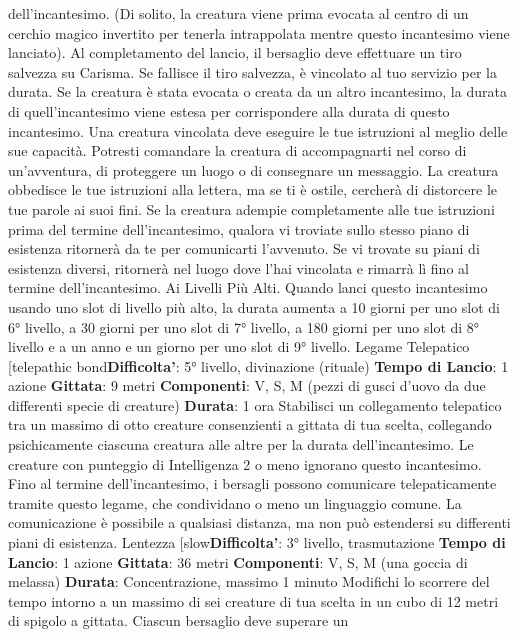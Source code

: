 \begin{multicols}{2}
dell’incantesimo. (Di solito, la creatura viene prima
evocata al centro di un cerchio magico invertito per
tenerla intrappolata mentre questo incantesimo viene
lanciato). Al completamento del lancio, il bersaglio deve
effettuare un tiro salvezza su Carisma. Se fallisce il tiro
salvezza, è vincolato al tuo servizio per la durata. Se la
creatura è stata evocata o creata da un altro
incantesimo, la durata di quell’incantesimo viene estesa
per corrispondere alla durata di questo incantesimo.
Una creatura vincolata deve eseguire le tue istruzioni al
meglio delle sue capacità. Potresti comandare la
creatura di accompagnarti nel corso di un’avventura, di
proteggere un luogo o di consegnare un messaggio. La
creatura obbedisce le tue istruzioni alla lettera, ma se ti
è ostile, cercherà di distorcere le tue parole ai suoi fini.
Se la creatura adempie completamente alle tue
istruzioni prima del termine dell’incantesimo, qualora vi
troviate sullo stesso piano di esistenza ritornerà da te
per comunicarti l’avvenuto. Se vi trovate su piani di
esistenza diversi, ritornerà nel luogo dove l’hai vincolata
e rimarrà lì fino al termine dell’incantesimo.
Ai Livelli Più Alti. Quando lanci questo incantesimo
usando uno slot di livello più alto, la durata aumenta a
10 giorni per uno slot di 6° livello, a 30 giorni per uno
slot di 7° livello, a 180 giorni per uno slot di 8° livello e a
un anno e un giorno per uno slot di 9° livello.
Legame Telepatico
[telepathic bond\textbf{Difficolta'}:
5° livello, divinazione (rituale)
\textbf{Tempo di Lancio}: 1 azione
\textbf{Gittata}: 9 metri
\textbf{Componenti}: V, S, M (pezzi di gusci d’uovo da due
differenti specie di creature)
\textbf{Durata}: 1 ora
Stabilisci un collegamento telepatico tra un massimo di
otto creature consenzienti a gittata di tua scelta,
collegando psichicamente ciascuna creatura alle altre
per la durata dell’incantesimo. Le creature con
punteggio di Intelligenza 2 o meno ignorano questo
incantesimo.
Fino al termine dell’incantesimo, i bersagli possono
comunicare telepaticamente tramite questo legame,
che condividano o meno un linguaggio comune. La
comunicazione è possibile a qualsiasi distanza, ma non
può estendersi su differenti piani di esistenza.
Lentezza
[slow\textbf{Difficolta'}:
3° livello, trasmutazione
\textbf{Tempo di Lancio}: 1 azione
\textbf{Gittata}: 36 metri
\textbf{Componenti}: V, S, M (una goccia di melassa)
\textbf{Durata}: Concentrazione, massimo 1 minuto
Modifichi lo scorrere del tempo intorno a un massimo di
sei creature di tua scelta in un cubo di 12 metri di
spigolo a gittata. Ciascun bersaglio deve superare un

\end{multicols}
